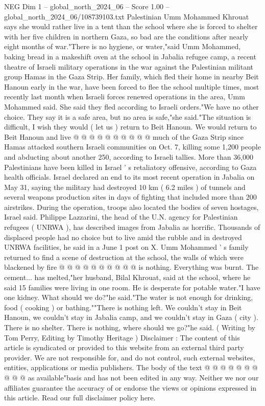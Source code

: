 \begin{textsample}{NEG Dim 1 – global\_north\_2024\_06 – Score 1.00 – global\_north\_2024\_06/108739103.txt}  \label{ex:f1_neg_145}
Palestinian Umm Mohammed Khrouat says she would rather live in a tent than the school where she is forced to shelter with her five children in northern Gaza, so bad are the conditions after nearly eight months of war."There is no hygiene, or water,"said Umm Mohammed, baking bread in a makeshift oven at the school in Jabalia refugee camp, a recent theatre of Israeli military operations in the war against the Palestinian militant group Hamas in the Gaza Strip.
Her family, which fled their home in nearby Beit Hanoun early in the war, have been forced to flee the school multiple times, most recently last month when Israeli forces renewed operations in the area, Umm Mohammed said.
She said they fled according to Israeli orders."We have no other choice.
They say it is a safe area, but no area is safe,"she said."The situation is difficult, I wish they would ( let us ) return to Beit Hanoun.
We would return to Beit Hanoun and live @ @ @ @ @ @ @ @ @ @ much of the Gaza Strip since Hamas attacked southern Israeli communities on Oct. 7, killing some 1,200 people and abducting about another 250, according to Israeli tallies.
More than 36,000 Palestinians have been killed in Israel ' s retaliatory offensive, according to Gaza health officials.
Israel declared an end to its most recent operation in Jabalia on May 31, saying the military had destroyed 10 km ( 6.2 miles ) of tunnels and several weapons production sites in days of fighting that included more than 200 airstrikes.
During the operation, troops also located the bodies of seven hostages, Israel said.
Philippe Lazzarini, the head of the U.N. agency for Palestinian refugees ( UNRWA ), has described images from Jabalia as horrific.
Thousands of displaced people had no choice but to live amid the rubble and in destroyed UNRWA facilities, he said in a June 1 post on X.
Umm Mohammed ' s family returned to find a scene of destruction at the school, the walls of which were blackened by fire @ @ @ @ @ @ @ @ @ @ is nothing.
Everything was burnt.
The cement... has melted,"her husband, Bilal Khrouat, said at the school, where he said 15 families were living in one room.
He is desperate for potable water."I have one kidney.
What should we do?"he said."The water is not enough for drinking, food ( cooking ) or bathing.""There is nothing left.
We couldn't stay in Beit Hanoun, we couldn't stay in Jabalia camp, and we couldn't stay in Gaza ( city ).
There is no shelter.
There is nothing, where should we go?"he said. ( Writing by Tom Perry, Editing by Timothy Heritage ) Disclaimer : The content of this article is syndicated or provided to this website from an external third party provider.
We are not responsible for, and do not control, such external websites, entities, applications or media publishers.
The body of the text @ @ @ @ @ @ @ @ @ @ as available"basis and has not been edited in any way.
Neither we nor our affiliates guarantee the accuracy of or endorse the views or opinions expressed in this article.
Read our full disclaimer policy here.

\end{textsample}
